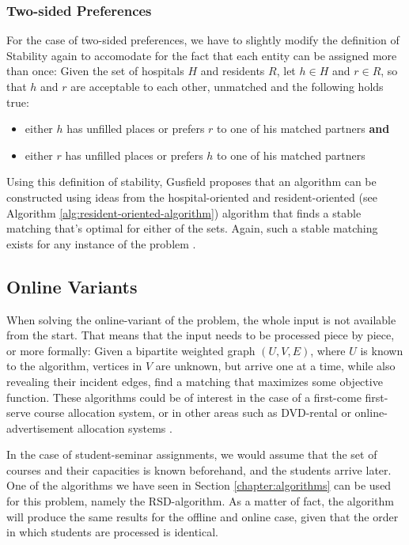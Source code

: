\subsubsection{Two-sided Preferences}
For the case of two-sided preferences, we have to slightly modify the definition of Stability again to accomodate for the fact that each entity can be assigned more than once: Given the set of hospitals $H$ and residents $R$, let $h \in H$ and $r \in R$, so that $h$ and $r$ are acceptable to each other, unmatched and the following holds true: 
\begin{itemize}
    \item either $h$ has unfilled places or prefers $r$ to one of his matched partners \textbf{and}
    \item either $r$ has unfilled places or prefers $h$ to one of his matched partners
\end{itemize}
Using this definition of stability, Gusfield\cite{Gusfield} proposes that an algorithm can be constructed using ideas from the hospital-oriented and resident-oriented (see Algorithm \ref{alg:resident-oriented-algorithm}) algorithm that finds a stable matching that's optimal for either of the sets. Again, such a stable matching exists for any instance of the problem \cite{Gusfield}.

\subsection{Online Variants}
When solving the online-variant of the problem, the whole input is not available from the start. That means that the input needs to be processed piece by piece, or more formally: Given a bipartite weighted graph $(U, V, E)$, where $U$ is known to the algorithm, vertices in $V$ are unknown, but arrive one at a time, while also revealing their incident edges, find a matching that maximizes some objective function. These algorithms could be of interest in the case of a first-come first-serve course allocation system, or in other areas such as DVD-rental or online-advertisement allocation systems \cite{Mehta:Online}.

In the case of student-seminar assignments, we would assume that the set of courses and their capacities is known beforehand, and the students arrive later. One of the algorithms we have seen in Section \ref{chapter:algorithms} can be used for this problem, namely the RSD-algorithm. As a matter of fact, the algorithm will produce the same results for the offline and online case, given that the order in which students are processed is identical.

